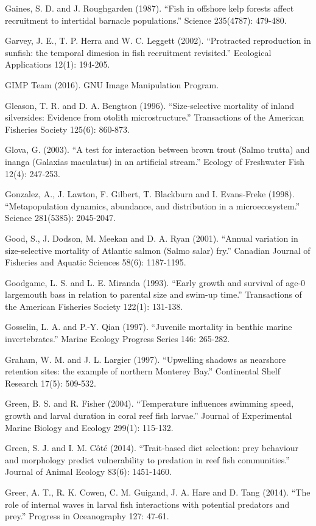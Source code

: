 \documentclass[]{book}
\begin{document}
Gaines, S. D. and J. Roughgarden (1987). ``Fish in offshore kelp forests
affect recruitment to intertidal barnacle populations.'' Science
235(4787): 479-480.

Garvey, J. E., T. P. Herra and W. C. Leggett (2002). ``Protracted
reproduction in sunfish: the temporal dimesion in fish recruitment
revisited.'' Ecological Applications 12(1): 194-205.

GIMP Team (2016). GNU Image Manipulation Program.

Gleason, T. R. and D. A. Bengtson (1996). ``Size-selective mortality of
inland silversides: Evidence from otolith microstructure.'' Transactions
of the American Fisheries Society 125(6): 860-873.

Glova, G. (2003). ``A test for interaction between brown trout (Salmo
trutta) and inanga (Galaxias maculatus) in an artificial stream.''
Ecology of Freshwater Fish 12(4): 247-253.

Gonzalez, A., J. Lawton, F. Gilbert, T. Blackburn and I. Evans-Freke
(1998). ``Metapopulation dynamics, abundance, and distribution in a
microecosystem.'' Science 281(5385): 2045-2047.

Good, S., J. Dodson, M. Meekan and D. A. Ryan (2001). ``Annual variation
in size-selective mortality of Atlantic salmon (Salmo salar) fry.''
Canadian Journal of Fisheries and Aquatic Sciences 58(6): 1187-1195.

Goodgame, L. S. and L. E. Miranda (1993). ``Early growth and survival of
age-0 largemouth bass in relation to parental size and swim-up time.''
Transactions of the American Fisheries Society 122(1): 131-138.

Gosselin, L. A. and P.-Y. Qian (1997). ``Juvenile mortality in benthic
marine invertebrates.'' Marine Ecology Progress Series 146: 265-282.

Graham, W. M. and J. L. Largier (1997). ``Upwelling shadows as nearshore
retention sites: the example of northern Monterey Bay.'' Continental
Shelf Research 17(5): 509-532.

Green, B. S. and R. Fisher (2004). ``Temperature influences swimming
speed, growth and larval duration in coral reef fish larvae.'' Journal
of Experimental Marine Biology and Ecology 299(1): 115-132.

Green, S. J. and I. M. Côté (2014). ``Trait‐based diet selection: prey
behaviour and morphology predict vulnerability to predation in reef fish
communities.'' Journal of Animal Ecology 83(6): 1451-1460.

Greer, A. T., R. K. Cowen, C. M. Guigand, J. A. Hare and D. Tang (2014).
``The role of internal waves in larval fish interactions with potential
predators and prey.'' Progress in Oceanography 127: 47-61.
\end{document}
